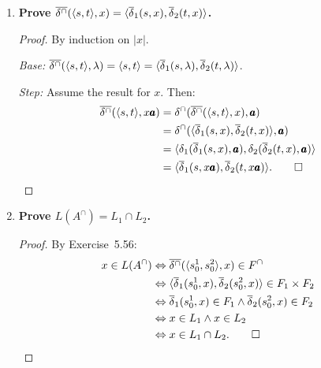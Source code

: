 \begin{enumerate}[{5.}1. ]
$M(L)=\{z\mid z=xy,x\in L,y\in\Sigma^+\}=L\cdot\Sigma^+$.  By closure under concatenation, $L\cdot\Sigma^+\in\DSIG$.

\begin{enumerate}[(a)]
  \item \textbf{Construction:} Concatenate $A$ (for $L$) with a DFA for $\Sigma^+$ (which is a two-state machine: start nonfinal, self-loop on $\Sigma$ to final, final self-loops on $\Sigma$).
  \item \textbf{Proof:} By Theorem~5.4, $M(L)=L(A^\bullet)\in\DSIG$.
  \item \qed
\end{enumerate}

\item \textbf{Prove $\overline{\delta^\cap}(\langle s,t\rangle,x)=\langle\overline{\delta}_1(s,x),\overline{\delta}_2(t,x)\rangle$.}

\begin{proof}
By induction on $|x|$.

\emph{Base:}  $\overline{\delta^\cap}(\langle s,t\rangle,\lambda)=\langle s,t\rangle=\langle\overline{\delta}_1(s,\lambda),\overline{\delta}_2(t,\lambda)\rangle$.

\emph{Step:}  Assume the result for $x$.  Then:
\begin{align*}
  \overline{\delta^\cap}(\langle s,t\rangle,x\pmb{a})
  &=\delta^\cap(\overline{\delta^\cap}(\langle s,t\rangle,x),\pmb{a}) \\
  &=\delta^\cap(\langle\overline{\delta}_1(s,x),\overline{\delta}_2(t,x)\rangle,\pmb{a}) \\
  &=\langle\delta_1(\overline{\delta}_1(s,x),\pmb{a}),\delta_2(\overline{\delta}_2(t,x),\pmb{a})\rangle \\
  &=\langle\overline{\delta}_1(s,x\pmb{a}),\overline{\delta}_2(t,x\pmb{a})\rangle. \qed
\end{align*}
\end{proof}

\item \textbf{Prove $L(A^\cap)=L_1\cap L_2$.}

\begin{proof}
By Exercise~5.56:
\begin{align*}
  x\in L(A^\cap)
  &\Leftrightarrow\overline{\delta^\cap}(\langle s^1_0,s^2_0\rangle,x)\in F^\cap \\
  &\Leftrightarrow\langle\overline{\delta}_1(s^1_0,x),\overline{\delta}_2(s^2_0,x)\rangle\in F_1\times F_2 \\
  &\Leftrightarrow\overline{\delta}_1(s^1_0,x)\in F_1\wedge\overline{\delta}_2(s^2_0,x)\in F_2 \\
  &\Leftrightarrow x\in L_1\wedge x\in L_2 \\
  &\Leftrightarrow x\in L_1\cap L_2. \qed
\end{align*}
\end{proof}


\end{enumerate}
